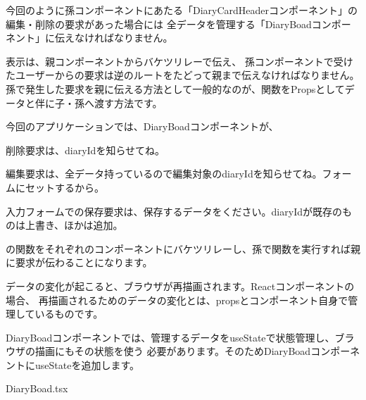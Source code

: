今回のように孫コンポーネントにあたる「DiaryCardHeaderコンポーネント」の編集・削除の要求があった場合には
全データを管理する「DiaryBoadコンポーネント」に伝えなければなりません。

\vspace*{\baselineskip}

表示は、親コンポーネントからバケツリレーで伝え、
孫コンポーネントで受けたユーザーからの要求は逆のルートをたどって親まで伝えなければなりません。
孫で発生した要求を親に伝える方法として一般的なのが、関数をPropsとしてデータと伴に子・孫へ渡す方法です。

\vspace*{\baselineskip}

今回のアプリケーションでは、DiaryBoadコンポーネントが、

\begin{starteritemize}
\item 削除要求は、diaryIdを知らせてね。
\item 編集要求は、全データ持っているので編集対象のdiaryIdを知らせてね。フォームにセットするから。
\item 入力フォームでの保存要求は、保存するデータをください。diaryIdが既存のものは上書き、ほかは追加。
\end{starteritemize}

の関数をそれぞれのコンポーネントにバケツリレーし、孫で関数を実行すれば親に要求が伝わることになります。

\vspace*{\baselineskip}

データの変化が起こると、ブラウザが再描画されます。Reactコンポーネントの場合、
再描画されるためのデータの変化とは、propsとコンポーネント自身で管理しているものです。

\vspace*{\baselineskip}

DiaryBoadコンポーネントでは、管理するデータをuseStateで状態管理し、ブラウザの描画にもその状態を使う
必要があります。そのためDiaryBoadコンポーネントにuseStateを追加します。

\def\startercodeblockfontsize{}
\begin{starterprogram}[]{DiaryBoad.tsx}\end{starterprogram}

